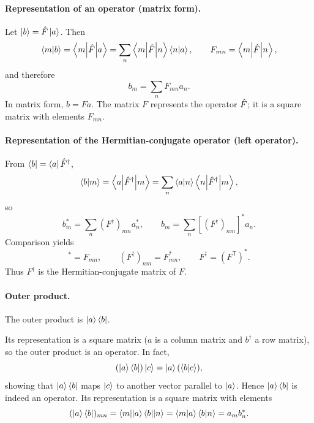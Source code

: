 \paragraph{Representation of an operator (matrix form).}
Let $\left|b\right\rangle=\hat{F}\left|a\right\rangle$. Then
\begin{equation}
\left\langle m\middle|b\right\rangle=\left\langle m\middle|\hat{F}\middle|a\right\rangle
=\sum_n\left\langle m\middle|\hat{F}\middle|n\right\rangle\left\langle n\middle|a\right\rangle,
\qquad F_{mn}=\left\langle m\middle|\hat{F}\middle|n\right\rangle,
\end{equation}
and therefore
\begin{equation}
b_m=\sum_n F_{mn}a_n.
\end{equation}
In matrix form, $b=Fa$. The matrix $F$ represents the operator $\hat{F}$; it is a square matrix with elements $F_{mn}$.
\paragraph{Representation of the Hermitian-conjugate operator (left operator).}
From $\left\langle b\right|=\left\langle a\right|\hat{F}^\dagger$,
\begin{equation}
\left\langle b\middle|m\right\rangle=\left\langle a\middle|\hat{F}^\dagger\middle|m\right\rangle
=\sum_n\left\langle a\middle|n\right\rangle\left\langle n\middle|\hat{F}^\dagger\middle|m\right\rangle,
\end{equation}
so
\begin{equation}
b_m^*=\sum_n (F^\dagger)_{nm}a_n^*,\qquad
b_m=\sum_n[(F^\dagger)_{nm}]^*a_n.
\end{equation}
Comparison yields
\begin{equation}
[(F^\dagger)_{nm}]^*=F_{mn},\qquad
(F^\dagger)_{nm}=F_{mn}^*,\qquad
F^\dagger=(F^{\mathsf T})^*.
\end{equation}
Thus $F^\dagger$ is the Hermitian-conjugate matrix of $F$.
\paragraph{Outer product.}
The outer product is $\left|a\right\rangle\left\langle b\right|$.

Its representation is a square matrix ($a$ is a column matrix and $b^\dagger$ a row matrix), so the outer product is an operator. In fact,
\begin{equation}
(\left|a\right\rangle\left\langle b\right|)\left|c\right\rangle=\left|a\right\rangle(\left\langle b\middle|c\right\rangle),
\end{equation}
showing that $\left|a\right\rangle\left\langle b\right|$ maps $\left|c\right\rangle$ to another vector parallel to $\left|a\right\rangle$. Hence $\left|a\right\rangle\left\langle b\right|$ is indeed an operator. Its representation is a square matrix with elements
\begin{equation}
(\left|a\right\rangle\left\langle b\right|)_{mn}=\left\langle m\middle|\left|a\right\rangle\left\langle b\right|\middle|n\right\rangle
=\left\langle m\middle|a\right\rangle\left\langle b\middle|n\right\rangle=a_mb_n^*.
\end{equation}


